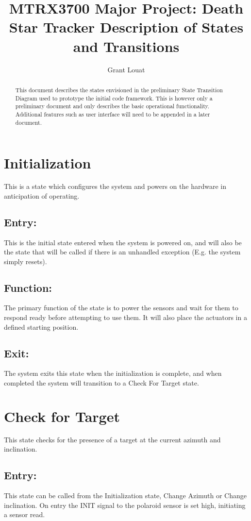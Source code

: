 \documentclass[]{article}
\title{MTRX3700 Major Project: Death Star Tracker \newline Description of States and Transitions}
\author{Grant Louat}
\begin{document}
\maketitle

\begin{abstract}
This document describes the states envisioned in the preliminary State Transition Diagram used to prototype the initial code framework. This is however only a preliminary document and only describes the basic operational functionality. Additional features such as user interface will need to be appended in a later document.
\end{abstract}

\section{Initialization}
This is a state which configures the system and powers on the hardware in anticipation of operating.

\subsection{Entry:}
This is the initial state entered when the system is powered on, and will also be the state that will be called if there is an unhandled exception (E.g. the system simply resets).

\subsection{Function:}
The primary function of the state is to power the sensors and wait for them to respond ready before attempting to use them. It will also place the actuators in a defined starting position.

\subsection{Exit:}
The system exits this state when the initialization is complete, and when completed the system will transition to a Check For Target state.

\section{Check for Target}
This state checks for the presence of a target at the current azimuth and inclination.

\subsection{Entry:}
This state can be called from the Initialization state, Change Azimuth or Change inclination. On entry the INIT signal to the polaroid sensor is set high, initiating a sensor read.
\end{document}
